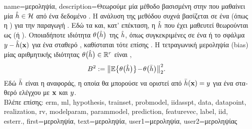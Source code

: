 {name={\foreignlanguage{greek}{μεροληψία}},
	description={\foreignlanguage{greek}{Θεωρούμε μία μέθοδο} 
		 \foreignlanguage{greek}{βασισμένη στην}  \foreignlanguage{greek}{που μαθαίνει μία} 
		 $\hat{h} \in \mathcal{H}$ \foreignlanguage{greek}{από ένα δεδομένο} . 
		\foreignlanguage{greek}{Η ανάλυση της μεθόδου}  \foreignlanguage{greek}{συχνά βασίζεται σε ένα} 
		 (\foreignlanguage{greek}{όπως η} ) \foreignlanguage{greek}{για την 
		παραγωγή} . \foreignlanguage{greek}{Εδώ τα}  \foreignlanguage{greek}{και, 
		κατ' επέκταση, η}  $\hat{h}$ \foreignlanguage{greek}{που έχει μαθευτεί θεωρούνται ως} 
		 (\foreignlanguage{greek}{ή}  ). \foreignlanguage{greek}{Οποιαδήποτε 
		ιδιότητα $\theta\big(\hat{h}\big)$ της $\hat{h}$, όπως συγκεκριμένες}  
		\foreignlanguage{greek}{σε ένα}  \foreignlanguage{greek}{ή το σφάλμα}  
		$y - \hat{h}({\bf x})$ \foreignlanguage{greek}{για ένα σταθερό} , 
		\foreignlanguage{greek}{καθίσταται τότε επίσης} . \foreignlanguage{greek}{Η τετραγωνική μεροληψία}
		(bias) \foreignlanguage{greek}{μίας αριθμητικής ιδιότητας $\theta\big(\hat{h}\big) \in \mathbb{R}^{r}$ είναι}
		\cite{BishopBook}, \cite{hastie01statisticallearning}
		$$B^{2} := \big\| \mathbb{E} \big\{ \theta\big(\hat{h}\big) \big\}\!-\!\theta\big(\bar{h}\big)  \big\|_{2}^{2}.$$
		\foreignlanguage{greek}{Εδώ $\bar{h}$ είναι η}  \foreignlanguage{greek}{αναφοράς, η οποία  
		θα μπορούσε να οριστεί από $\bar{h}({\bf x})=y$ για ένα σταθερό}  
		\foreignlanguage{greek}{ελέγχου με}  ${\bf x}$ \foreignlanguage{greek}{και}  $y$. 
		\\
		\foreignlanguage{greek}{Βλέπε επίσης:} \gls{erm}, \gls{ml}, \gls{hypothesis}, \gls{trainset}, \gls{probmodel}, \gls{iidasspt}, \gls{data}, 
		\gls{datapoint}, \gls{realization}, \gls{rv}, \gls{modelparam}, \gls{parammodel}, \gls{prediction}, \gls{featurevec}, \gls{label}, \gls{iid}, 
		\gls{esterr}.},
	first={\foreignlanguage{greek}{μεροληψία}},
	text={\foreignlanguage{greek}{μεροληψία}},
	user1={\foreignlanguage{greek}{μεροληψία}}, %
	user2={\foreignlanguage{greek}{μεροληψίας}} %
}

